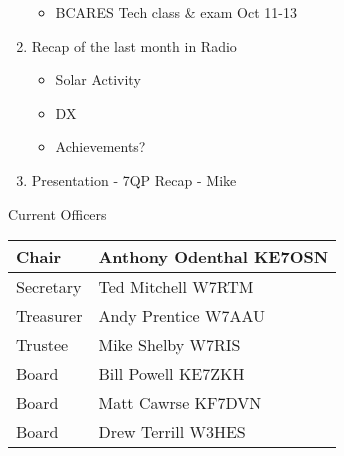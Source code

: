 \documentclass[letter,11pt]{extarticle}
\begin{document}
\begin{enumerate}
\begin{itemize}
				\item BCARES Tech class \& exam Oct 11-13
			\end{itemize}
		\item Recap of the last month in Radio
			\begin{itemize}
				\item Solar Activity
				\item DX
				\item Achievements?
			\end{itemize}
		\item  Presentation - 7QP Recap - Mike

	\end{enumerate}


	Current Officers \\
	\begin{tabular}{|l|l|} \hline
		Chair & Anthony Odenthal KE7OSN \\ \hline
		Secretary & Ted Mitchell W7RTM \\ \hline
		Treasurer & Andy Prentice W7AAU \\ \hline
		Trustee & Mike Shelby W7RIS   \\ \hline
		Board & Bill Powell KE7ZKH \\ \hline
		Board & Matt Cawrse KF7DVN \\ \hline
		Board & Drew Terrill W3HES\\ \hline
	\end{tabular}
	
	\subsection*{}
	
\end{document}
